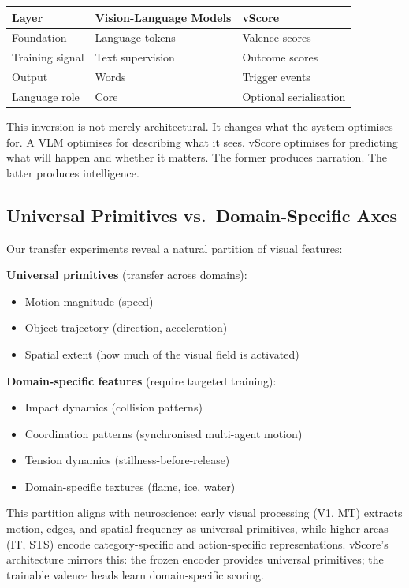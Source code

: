 \documentclass[11pt]{article}
\begin{document}
\begin{table}[h]
\centering
\begin{tabular}{lll}
\toprule
\textbf{Layer} & \textbf{Vision-Language Models} & \textbf{vScore} \\
\midrule
Foundation & Language tokens & Valence scores \\
Training signal & Text supervision & Outcome scores \\
Output & Words & Trigger events \\
Language role & Core & Optional serialisation \\
\bottomrule
\end{tabular}
\end{table}

This inversion is not merely architectural. It changes what the system optimises for. A VLM optimises for describing what it sees. vScore optimises for predicting what will happen and whether it matters. The former produces narration. The latter produces intelligence.

\subsection{Universal Primitives vs.\ Domain-Specific Axes}

Our transfer experiments reveal a natural partition of visual features:

\textbf{Universal primitives} (transfer across domains):
\begin{itemize}
    \item Motion magnitude (speed)
    \item Object trajectory (direction, acceleration)
    \item Spatial extent (how much of the visual field is activated)
\end{itemize}

\textbf{Domain-specific features} (require targeted training):
\begin{itemize}
    \item Impact dynamics (collision patterns)
    \item Coordination patterns (synchronised multi-agent motion)
    \item Tension dynamics (stillness-before-release)
    \item Domain-specific textures (flame, ice, water)
\end{itemize}

This partition aligns with neuroscience: early visual processing (V1, MT) extracts motion, edges, and spatial frequency as universal primitives, while higher areas (IT, STS) encode category-specific and action-specific representations. vScore's architecture mirrors this: the frozen encoder provides universal primitives; the trainable valence heads learn domain-specific scoring.
\end{document}
